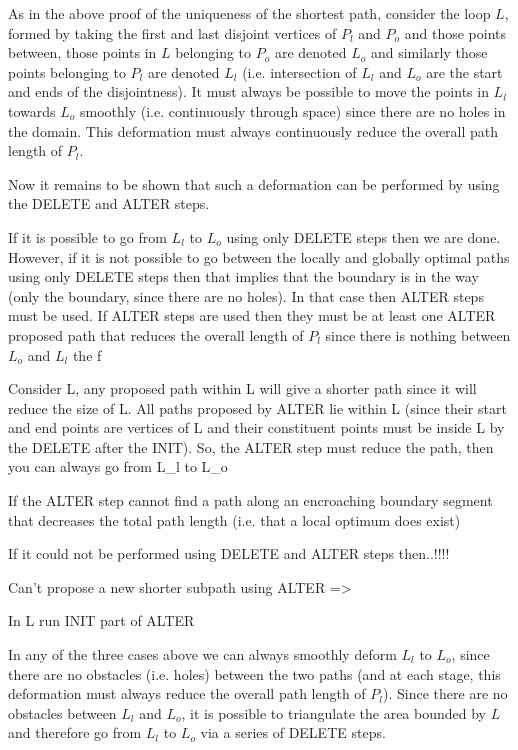 As in the above proof of the uniqueness of the shortest path, consider the loop $L$, formed by taking the first and last disjoint vertices of $P_l$ and $P_o$ and those points between, those points in $L$ belonging to $P_o$ are denoted $L_o$ and similarly those points belonging to $P_l$ are denoted $L_l$ (i.e. intersection of $L_l$ and $L_o$ are the start and ends of the disjointness). It must always be possible to move the points in $L_l$ towards $L_o$ smoothly (i.e. continuously through space) since there are no holes in the domain. This deformation must always continuously reduce the overall path length of $P_l$.

Now it remains to be shown that such a deformation can be performed by using the DELETE and ALTER steps. 

If it is possible to go from $L_l$ to $L_o$ using only DELETE steps then we are done. However, if it is not possible to go between the locally and globally optimal paths using only DELETE steps then that implies that the boundary is in the way (only the boundary, since there are no holes).  In that case then ALTER steps must be used. If ALTER steps are used then they must be at least one ALTER proposed path that reduces the overall length of $P_l$ since  there is nothing between $L_o$ and $L_l$ the f

Consider L, any proposed path within L will give a shorter path since it will reduce the size of L. All paths proposed by ALTER lie within L (since their start and end points are vertices of L and their constituent points must be inside L by the DELETE after the INIT). So, the ALTER step must reduce the path, then you can always go from L_l to L_o


If the ALTER step cannot find a path along an encroaching boundary segment that decreases the total path length (i.e. that a local optimum does exist)


If it could not be performed using DELETE and ALTER steps then..!!!!


Can't propose a new shorter subpath using ALTER => 


In L run INIT part of ALTER


In any of the three cases above we can always smoothly deform $L_l$ to $L_o$, since there are no obstacles (i.e. holes) between the two paths (and at each stage, this deformation must always reduce the overall path length of $P_l$). Since there are no obstacles between $L_l$ and $L_o$, it is possible to triangulate the area bounded by $L$ and therefore go from $L_l$ to $L_o$ via a series of DELETE steps. 



